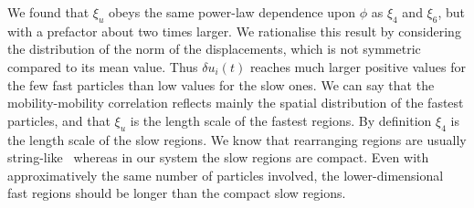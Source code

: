\documentclass[prl,twocolumn,notitlepage]{revtex4-1}
\begin{document}
We found that $\xi_u$ obeys the same power-law dependence upon $\phi$ as $\xi_4$ and $\xi_6$, but with a prefactor about two times larger. We rationalise this result by considering the distribution of the norm of the displacements, which is not symmetric compared to its mean value. Thus $\delta u_i(t)$ reaches much larger positive values for the few fast particles than low values for the slow ones. We can say that the mobility-mobility correlation reflects mainly the spatial distribution of the fastest particles, and that $\xi_u$ is the length scale of the fastest regions. By definition $\xi_4$ is the length scale of the slow regions. We know that rearranging regions are usually string-like~\cite{Donati1999} whereas in our system the slow regions are compact. Even with approximatively the same number of particles involved, the lower-dimensional fast regions should be longer than the compact slow regions.



%

\end{document}

